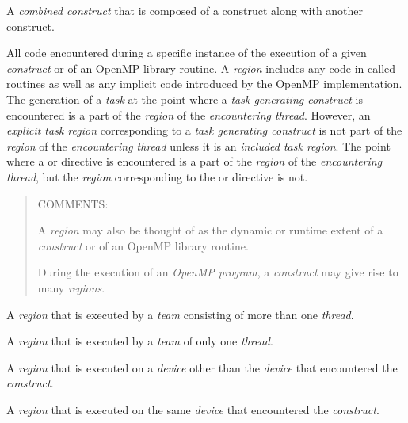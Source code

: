 \glossarydefstart
A \emph{combined construct} that is composed of a  construct 
along with another construct.
\glossarydefend


\glossarydefstart
All code encountered during a specific instance of the execution of a given
\emph{construct} or of an OpenMP library routine. A \emph{region} includes 
any code in called routines as well as any implicit code introduced by the 
OpenMP implementation. The generation of a \emph{task} at the point where 
a \emph{task generating construct} is encountered is a part of the 
\emph{region} of the \emph{encountering thread}.  However, an 
\emph{explicit task region} corresponding to a 
\emph{task generating construct} is not part of the \emph{region} of the 
\emph{encountering thread} unless it is an \emph{included task region}. 
The point where a  or  directive is encountered 
is a part of the \emph{region} of the \emph{encountering thread}, but the
\emph{region} corresponding to the  or  directive 
is not.

\begin{quote}
COMMENTS:

A \emph{region} may also be thought of as the dynamic or runtime extent of a
\emph{construct} or of an OpenMP library routine.

During the execution of an \emph{OpenMP program}, a \emph{construct} may give
rise to many \emph{regions}.
\end{quote}
\glossarydefend

\glossarydefstart
A  \emph{region} that is executed by a \emph{team} consisting 
of more than one
\emph{thread}.
\glossarydefend

\smallskip
{}
\glossarydefstart
A  \emph{region} that is executed by a \emph{team} of only 
one \emph{thread}.
\glossarydefend

\glossarydefstart
A  \emph{region} that is executed on a \emph{device} other 
than the \emph{device} that encountered the  \emph{construct}. 
\glossarydefend

\smallskip
{}
\glossarydefstart
A  \emph{region} that is executed on the same \emph{device} 
that encountered the  \emph{construct}.
\glossarydefend

